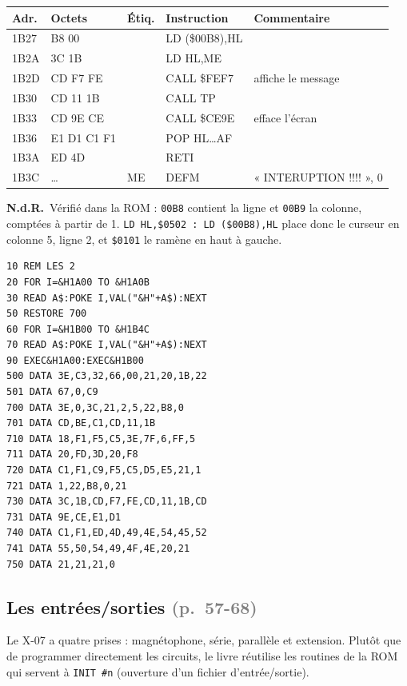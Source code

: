 \documentclass[a4paper,10pt]{article}
\makeatletter
\newcommand{\hex}[1]{\texttt{#1}}
\newcommand{\pg}[1]{\texorpdfstring{\textcolor{gray}{\small(p.~#1)}}{}}
\newcommand{\nota}[1]{\textcolor{red!60!black}{\small\textbf{N.d.R.}~#1}}
\newenvironment{asm}
  {\small\begin{longtable}{@{}>{\ttfamily}l>{\ttfamily}l>{\ttfamily}l>{\ttfamily}l>{\raggedright\arraybackslash}p{6.2cm}@{}}
   \toprule
   \normalfont\bfseries Adr. & \normalfont\bfseries Octets & \normalfont\bfseries Étiq. & \normalfont\bfseries Instruction & \textbf{Commentaire}\\
   \midrule\endhead
   \bottomrule\endfoot}
  {\end{longtable}}
\makeatother
\begin{document}
\begin{asm}
1B27 & 22 B8 00 & & LD (\$00B8),HL & \\
1B2A & 21 3C 1B & & LD HL,ME       & \\
1B2D & CD F7 FE & & CALL \$FEF7    & affiche le message \\
1B30 & CD 11 1B & & CALL TP        & \\
1B33 & CD 9E CE & & CALL \$CE9E    & efface l'écran \\
1B36 & E1 D1 C1 F1 & & POP HL\dots AF & \\
1B3A & ED 4D    & & RETI           & \\
1B3C & \dots    & ME & DEFM        & « INTERUPTION !!!! », 0 \\
\end{asm}
\nota{Vérifié dans la ROM : \hex{00B8} contient la ligne et \hex{00B9} la
colonne, comptées à partir de 1. \texttt{LD HL,\$0502 : LD (\$00B8),HL}
place donc le curseur en colonne 5, ligne 2, et \texttt{\$0101} le ramène en
haut à gauche.}
\begin{verbatim}
10 REM LES 2
20 FOR I=&H1A00 TO &H1A0B
30 READ A$:POKE I,VAL("&H"+A$):NEXT
50 RESTORE 700
60 FOR I=&H1B00 TO &H1B4C
70 READ A$:POKE I,VAL("&H"+A$):NEXT
90 EXEC&H1A00:EXEC&H1B00
500 DATA 3E,C3,32,66,00,21,20,1B,22
501 DATA 67,0,C9
700 DATA 3E,0,3C,21,2,5,22,B8,0
701 DATA CD,BE,C1,CD,11,1B
710 DATA 18,F1,F5,C5,3E,7F,6,FF,5
711 DATA 20,FD,3D,20,F8
720 DATA C1,F1,C9,F5,C5,D5,E5,21,1
721 DATA 1,22,B8,0,21
730 DATA 3C,1B,CD,F7,FE,CD,11,1B,CD
731 DATA 9E,CE,E1,D1
740 DATA C1,F1,ED,4D,49,4E,54,45,52
741 DATA 55,50,54,49,4F,4E,20,21
750 DATA 21,21,21,0
\end{verbatim}

\subsection{Les entrées/sorties \pg{57-68}}

Le X-07 a quatre prises : magnétophone, série, parallèle et extension.
Plutôt que de programmer directement les circuits, le livre réutilise les
routines de la ROM qui servent à \texttt{INIT \#n} (ouverture d'un fichier
d'entrée/sortie).
\end{document}
